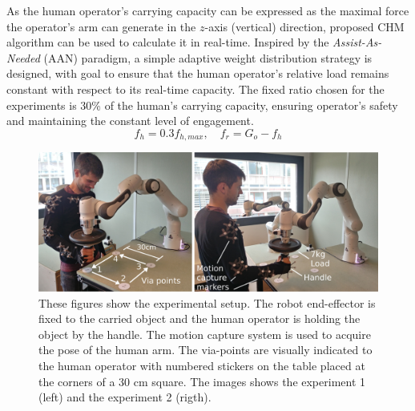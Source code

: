 

{As the human operator's carrying capacity can be expressed as the maximal force the operator's arm can generate in the $z$-axis (vertical) direction, proposed CHM algorithm can be used to calculate it in real-time.}
{ Inspired by} the \textit{Assist-As-Needed} (AAN)\cite{carmichael2013admittance} paradigm, {a simple adaptive weight distribution strategy is designed, with goal to ensure} that the human operator's relative load remains constant with respect to its real-time capacity. The fixed ratio chosen for the experiments is 30\% of the human's carrying capacity, {ensuring operator's safety and maintaining the constant level of engagement}.
$$
f_h = 0.3 f_{h,max}, \quad f_r = G_o - f_h
$$


\begin{figure}[!t]
    \centering
    \includegraphics[width=\linewidth]{Papers/images/both_pose_explanation.jpg}
    \caption{{These figures show the experimental setup. The robot end-effector is fixed to the carried object and the human operator is holding the object by the handle. The motion capture system is used to acquire the pose of the human arm. The via-points are visually indicated to the human operator with numbered stickers on the table placed at the corners of a 30 cm square. The images shows the experiment 1 (left) and the experiment 2 (rigth).}}
    \label{fig:experiment}
\end{figure}

